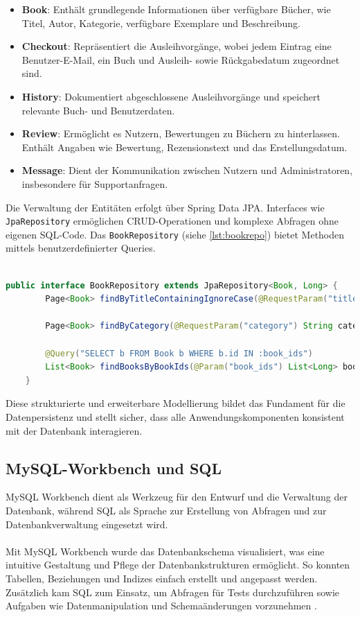 \begin{itemize}
	\item \textbf{Book}: Enthält grundlegende Informationen über verfügbare Bücher, wie Titel, Autor, Kategorie, verfügbare Exemplare und Beschreibung.
	\item \textbf{Checkout}: Repräsentiert die Ausleihvorgänge, wobei jedem Eintrag eine Benutzer-E-Mail, ein Buch und Ausleih- sowie Rückgabedatum zugeordnet sind.
	\item \textbf{History}: Dokumentiert abgeschlossene Ausleihvorgänge und speichert relevante Buch- und Benutzerdaten.
	\item \textbf{Review}: Ermöglicht es Nutzern, Bewertungen zu Büchern zu hinterlassen. Enthält Angaben wie Bewertung, Rezensionstext und das Erstellungsdatum.
	\item \textbf{Message}: Dient der Kommunikation zwischen Nutzern und Administratoren, insbesondere für Supportanfragen.
\end{itemize}
Die Verwaltung der Entitäten erfolgt über Spring Data JPA. Interfaces wie \texttt{JpaRepository} ermöglichen CRUD-Operationen und komplexe Abfragen ohne eigenen SQL-Code. Das \texttt{BookRepository}  (siehe \ref{lst:bookrepo}) bietet Methoden mittels benutzerdefinierter Queries. \\ \\
\begin{lstlisting}[language=Java, caption={Ausschnitt aus dem BookRepository}, label={lst:bookrepo}, breaklines=true]
	public interface BookRepository extends JpaRepository<Book, Long> {
		Page<Book> findByTitleContainingIgnoreCase(@RequestParam("title") String title, Pageable pageable);
		
		Page<Book> findByCategory(@RequestParam("category") String category, Pageable pageable);
		
		@Query("SELECT b FROM Book b WHERE b.id IN :book_ids")
		List<Book> findBooksByBookIds(@Param("book_ids") List<Long> bookId);
	}
\end{lstlisting}
Diese strukturierte und erweiterbare Modellierung bildet das Fundament für die Datenpersistenz und stellt sicher, dass alle Anwendungskomponenten konsistent mit der Datenbank interagieren.

\subsection{MySQL-Workbench und SQL}
MySQL Workbench dient als Werkzeug für den Entwurf und die Verwaltung der Datenbank, während SQL als Sprache zur Erstellung von Abfragen und zur Datenbankverwaltung eingesetzt wird. \\ \\
Mit MySQL Workbench wurde das Datenbankschema visualisiert, was eine intuitive Gestaltung und Pflege der Datenbankstrukturen ermöglicht. So konnten Tabellen, Beziehungen und Indizes einfach erstellt und angepasst werden. Zusätzlich kam SQL zum Einsatz, um Abfragen für Tests durchzuführen sowie Aufgaben wie Datenmanipulation und Schemaänderungen vorzunehmen \cite{mySQL:o.J}. 

